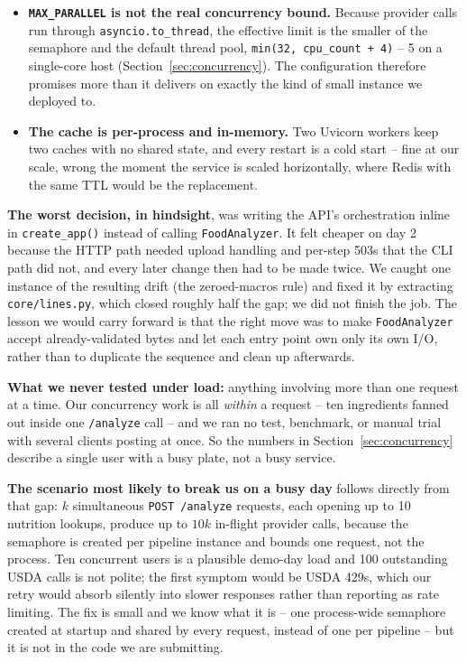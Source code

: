 \documentclass[11pt,a4paper]{article}
\begin{document}
\begin{itemize}[leftmargin=1.4em,itemsep=3pt]
  \item \textbf{\texttt{MAX\_PARALLEL} is not the real concurrency bound.}
  Because provider calls run through \texttt{asyncio.to\_thread}, the
  effective limit is the smaller of the semaphore and the default thread
  pool, \texttt{min(32, cpu\_count + 4)} -- 5 on a single-core host
  (Section~\ref{sec:concurrency}). The configuration therefore promises
  more than it delivers on exactly the kind of small instance we deployed
  to.
  \item \textbf{The cache is per-process and in-memory.} Two Uvicorn
  workers keep two caches with no shared state, and every restart is a
  cold start -- fine at our scale, wrong the moment the service is scaled
  horizontally, where Redis with the same TTL would be the replacement.
\end{itemize}

\par\noindent
\textbf{The worst decision, in hindsight}, was writing the API's
orchestration inline in \texttt{create\_app()} instead of calling
\texttt{FoodAnalyzer}. It felt cheaper on day 2 because the HTTP path
needed upload handling and per-step 503s that the CLI path did not, and
every later change then had to be made twice. We caught one instance of
the resulting drift (the zeroed-macros rule) and fixed it by extracting
\texttt{core/lines.py}, which closed roughly half the gap; we did not
finish the job. The lesson we would carry forward is that the right move
was to make \texttt{FoodAnalyzer} accept already-validated bytes and let
each entry point own only its own I/O, rather than to duplicate the
sequence and clean up afterwards.

\par\noindent
\textbf{What we never tested under load:} anything involving more than one
request at a time. Our concurrency work is all \emph{within} a request --
ten ingredients fanned out inside one \texttt{/analyze} call -- and we ran
no test, benchmark, or manual trial with several clients posting at once.
So the numbers in Section~\ref{sec:concurrency} describe a single user
with a busy plate, not a busy service.

\par\noindent
\textbf{The scenario most likely to break us on a busy day} follows
directly from that gap: $k$ simultaneous \texttt{POST /analyze} requests,
each opening up to 10 nutrition lookups, produce up to $10k$ in-flight
provider calls, because the semaphore is created per pipeline instance and
bounds one request, not the process. Ten concurrent users is a plausible
demo-day load and 100 outstanding USDA calls is not polite; the first
symptom would be USDA 429s, which our retry would absorb silently into
slower responses rather than reporting as rate limiting. The fix is small
and we know what it is -- one process-wide semaphore created at startup and
shared by every request, instead of one per pipeline -- but it is not in
the code we are submitting.
\end{document}
